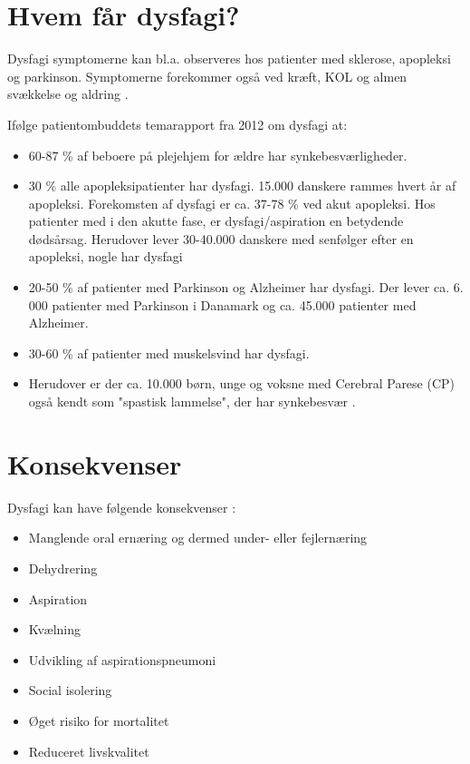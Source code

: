 \documentclass[main.tex]{subfiles}
\begin{document}
\section{Hvem får dysfagi?}

 Dysfagi symptomerne kan bl.a. observeres hos patienter med sklerose, apopleksi og parkinson.   Symptomerne forekommer også ved kræft, KOL og almen svækkelse og aldring \cite{SallyRefsgaardTinesterbyKristensen2015DysfagiKommune}. 

Ifølge patientombuddets temarapport fra 2012 om dysfagi at:

\begin{itemize}
\item 60-87 \% af beboere på plejehjem for ældre har synkebesværligheder.
\item 30 \% alle apopleksipatienter har dysfagi. 15.000 danskere rammes hvert år af apopleksi. Forekomsten af dysfagi er ca. 37-78 \% ved akut apopleksi. Hos patienter med i den akutte fase, er dysfagi/aspiration en betydende dødsårsag. Herudover lever 30-40.000 danskere med senfølger efter en apopleksi, nogle har dysfagi
\item 20-50 \% af patienter med Parkinson og Alzheimer har dysfagi. Der lever ca. 6. 000 patienter med Parkinson i Danamark og ca. 45.000 patienter med Alzheimer.  
\item 30-60 \% af patienter med muskelsvind har dysfagi.
\item Herudover er der ca. 10.000 børn, unge og voksne med Cerebral Parese (CP) også kendt som "spastisk lammelse", der har synkebesvær \cite{Bommersholdt2012TemarapportDysfagi}. 
\end{itemize}

\section{Konsekvenser}
Dysfagi kan have følgende konsekvenser \cite[s. 12]{KjaersgaardPh.d.studerendeDYSFAGIKonsekvenser}:
\begin{itemize}
\item Manglende oral ernæring og dermed under- eller fejlernæring
\item Dehydrering
\item Aspiration
\item Kvælning
\item Udvikling af aspirationspneumoni
\item Social isolering
\item Øget risiko for mortalitet
\item Reduceret livskvalitet

\end{itemize}
\end{document}
